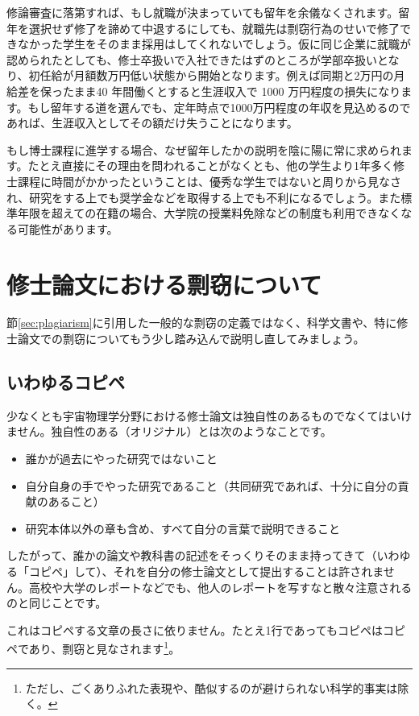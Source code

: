 修論審査に落第すれば、もし就職が決まっていても留年を余儀なくされます。留年を選択せず修了を諦めて中退するにしても、就職先は剽窃行為のせいで修了できなかった学生をそのまま採用はしてくれないでしょう。仮に同じ企業に就職が認められたとしても、修士卒扱いで入社できたはずのところが学部卒扱いとなり、初任給が月額数万円低い状態から開始となります。例えば同期と2万円の月給差を保ったまま40 年間働くとすると生涯収入で 1000 万円程度の損失になります。もし留年する道を選んでも、定年時点で1000万円程度の年収を見込めるのであれば、生涯収入としてその額だけ失うことになります。

もし博士課程に進学する場合、なぜ留年したかの説明を陰に陽に常に求められます。たとえ直接にその理由を問われることがなくとも、他の学生より1年多く修士課程に時間がかかったということは、優秀な学生ではないと周りから見なされ、研究をする上でも奨学金などを取得する上でも不利になるでしょう。また標準年限を超えての在籍の場合、大学院の授業料免除などの制度も利用できなくなる可能性があります。

\section{修士論文における剽窃について}
節\ref{sec:plagiarism}に引用した一般的な剽窃の定義ではなく、科学文書や、特に修士論文での剽窃についてもう少し踏み込んで説明し直してみましょう。

\subsection{いわゆるコピペ}

少なくとも宇宙物理学分野における修士論文は独自性のあるものでなくてはいけません。独自性のある（オリジナル）とは次のようなことです。
\begin{itemize}
\item 誰かが過去にやった研究ではないこと
\item 自分自身の手でやった研究であること（共同研究であれば、十分に自分の貢献のあること）
\item 研究本体以外の章も含め、すべて自分の言葉で説明できること
\end{itemize}

したがって、誰かの論文や教科書の記述をそっくりそのまま持ってきて（いわゆる「コピペ」して）、それを自分の修士論文として提出することは許されません。高校や大学のレポートなどでも、他人のレポートを写すなと散々注意されるのと同じことです。

これはコピペする文章の長さに依りません。たとえ1行であってもコピペはコピペであり、剽窃と見なされます\footnote{ただし、ごくありふれた表現や、酷似するのが避けられない科学的事実は除く。}。

